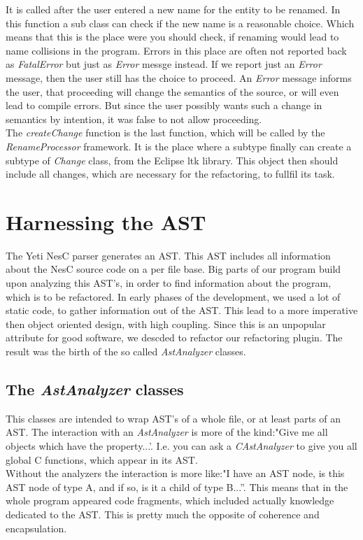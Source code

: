 \documentclass[a4paper,10pt]{report}
\begin{document}
It is called after the user entered a new name for the entity to be renamed.
In this function a sub class can check if the new name is a reasonable choice.
Which means that this is the place were you should check, if renaming would lead to name collisions in the program.
Errors in this place are often not reported back as {\it FatalError} but just as {\it Error} messge instead.
If we report just an {\it Error} message, then the user still has the choice to  proceed. An {\it Error} message informs the user, that proceeding
will change the semantics of the source, or will even lead to compile errors. But since the user possibly wants such a change in semantics by intention, it was false to not allow proceeding.\\
The {\it createChange} function is the last function, which will be called by the {\it RenameProcessor} framework. It is the place where a subtype finally can create a subtype of {\it Change} class, from the Eclipse ltk library.
This object then should include all changes, which are necessary for the refactoring, to fullfil its task.

\chapter{Harnessing the AST}
The Yeti NesC parser generates an AST. This AST includes all information about the NesC source code on a per file base. Big parts of our program build upon analyzing this AST's, in order to find information about the program, which is to be refactored.
In early phases of the development, we used a lot of static code, to gather information out of the AST. This lead to a more imperative then object oriented design, with high coupling. Since this is an unpopular attribute for good software, we descded to refactor our refactoring plugin. 
The result was the birth of the so called {\it AstAnalyzer} classes.

\section{The {\it AstAnalyzer} classes}
This classes are intended to wrap AST's of a whole file, or at least parts of an AST. The interaction with an {\it AstAnalyzer} is more of the kind:"Give me all objects which have the property...'. I.e. you can ask a {\it CAstAnalyzer} to give you all global C functions, which appear in its AST.\\
Without the analyzers the interaction is more like:"I have an AST node, is this AST node of type A, and if so, is it a child of type B...''. This means that in the whole program appeared code fragments, which included actually knowledge dedicated to the AST. This is pretty much the opposite of coherence and encapsulation.
\end{document}
